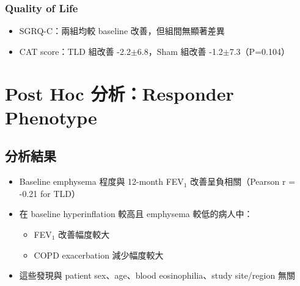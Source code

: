 \documentclass[12pt,a4paper]{article}
\begin{document}

\subsubsection{Quality of Life}

\begin{itemize}
    \item SGRQ-C：兩組均較 baseline 改善，但組間無顯著差異
    \item CAT score：TLD 組改善 -2.2$\pm$6.8，Sham 組改善 -1.2$\pm$7.3（P=0.104）
\end{itemize}

\section{Post Hoc 分析：Responder Phenotype}


\subsection{分析結果}

\begin{itemize}
    \item Baseline emphysema 程度與 12-month FEV$_1$ 改善呈負相關（Pearson r = -0.21 for TLD）
    \item 在 baseline hyperinflation 較高且 emphysema 較低的病人中：
    \begin{itemize}
        \item FEV$_1$ 改善幅度較大
        \item COPD exacerbation 減少幅度較大
    \end{itemize}
    \item 這些發現與 patient sex、age、blood eosinophilia、study site/region 無關
\end{itemize}
\end{document}
